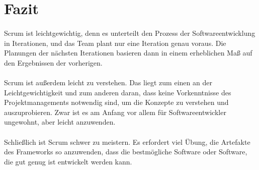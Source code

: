 \documentclass{article}
\begin{document}
\section{Fazit}
\paragraph{}
Scrum ist leichtgewichtig, denn es unterteilt den Prozess der Softwareentwicklung in Iterationen, und das Team plant nur eine Iteration genau voraus. Die Planungen der nächsten Iterationen basieren dann in einem erheblichen Maß auf den Ergebnissen der vorherigen.

\paragraph{}
Scrum ist außerdem leicht zu verstehen. Das liegt zum einen an der Leichtgewichtigkeit und zum anderen daran, dass keine Vorkenntnisse des Projektmanagements notwendig sind, um die Konzepte zu verstehen und auszuprobieren. Zwar ist es am Anfang vor allem für Softwareentwickler ungewohnt, aber leicht anzuwenden.

\paragraph{}
Schließlich ist Scrum schwer zu meistern. Es erfordert viel Übung, die Artefakte des Frameworks so anzuwenden, dass die bestmögliche Software oder Software, die gut genug ist \cite{bach} entwickelt werden kann.

\pagebreak

\printbibliography[heading=bibintoc,title=Literaturverzeichnis]

\pagebreak

\listoffigures
\end{document}
